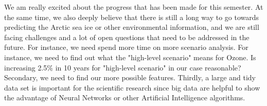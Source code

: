 We am really excited about the progress that has been made for this semester. At the same time, we also deeply believe that there is still a long way to go towards predicting the Arctic sea ice or other environmental information, and we are still facing challenges and a lot of open questions that need to be addressed in the future. For instance, we need spend more time on more scenario analysis. For instance, we need to find out what the "high-level scenario" means for Ozone. Is increasing 2.5\% in 10 years for "high-level scenario" in our case reasonable? Secondary, we need to find our more possible features. Thirdly, a large and tidy data set is important for the scientific research since big data are helpful to show the advantage of Neural Networks or other Artificial Intelligence algorithms.